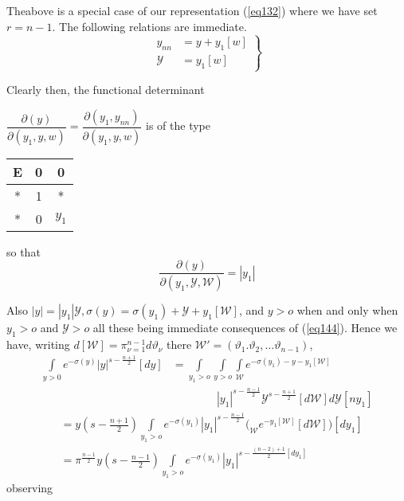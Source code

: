 The\pageoriginale  above is a special case of our representation
(\ref{eq132}) where we 
have set $r = n - 1$. The following relations are immediate. 
  \begin{equation}
  \left. 
  \begin{aligned}
  y_{n n} &= y + y_1 [w]\\
  \mathscr{Y}& = y_1 [ w ]
  \end{aligned}
  \right \} \tag{144}\label{eq144}  
  \end{equation}

Clearly then, the functional determinant

$\dfrac{\partial (y)}{\partial (y_1, y , w)} = \dfrac{\partial (y_1 ,
  y_{n n})}{\partial (y_1, y, w)}$ is of the
type \begin{tabular}{|c|c|c|} 
E & 0 &0 \\
\hline
* & 1 & *\\ 
\hline
* & 0 & $y_1$
\end{tabular}
 so that 
\begin{equation*}
\frac{\partial (y)}{\partial (y_1, \mathcal{Y},
  \mathscr{W})} = | y_1 | \tag{145}\label{eq145}   
\end{equation*}

Also $| y | = | y_1 | \mathcal{Y}, \sigma (y) = \sigma
(y_1) + \mathcal{Y} + y_1 [\mathscr{W}]$, and $y > o$
when and only when $y_1 > o$ and $\mathcal{Y} > o$ all these
being immediate consequences of (\ref{eq144}). Hence we have, writing $d
[\mathscr{W}] = \pi_{\nu = 1}^{n - 1} d \vartheta_\nu$ there
$\mathscr{W}' = (\vartheta_1. \vartheta_2, \ldots \vartheta_{n-1})$, 
\begin{align*}
\int\limits_{y > 0} e^{-\sigma (y)} | y |^{s- \frac{n + 1}{2}} [ d
  y ] & = \int\limits_{y_1 > o} \int\limits_{y>o}
\int\limits_{\mathscr{W}} e^{- \sigma (y_1) - y - y_1 [\mathscr{W}]}\\
& \qquad \qquad  | y_1
|^{s- \frac{n-1}{2}} \mathscr{Y}^{s-\frac{n+1}{2}} [ d \mathscr{W} ] d
\mathscr{Y} [ n y_1 ] 
\end{align*}
\begin{align*}
& = y (s- \frac{n+1}{2}) \int\limits_{y_1 > o} e^{-\sigma (y_1)}
  | y_1 |^{s - \frac{n-1}{2}}\bigg(_{\mathscr{W}} e^{-y_1
    [\mathscr{W}]} [ d \mathscr{W} ] \bigg) [ d y_1] \\ 
& = \pi^{\frac{n-1}{2}} y (s- \frac{n-1}{2}) \int\limits_{y_1 >
    o} e^{-\sigma (y_1)} | y_1 |^{s- \frac{(n - 2) + 1 }{2} [ d y_1 ]} 
\end{align*}
\hfill{observing}

